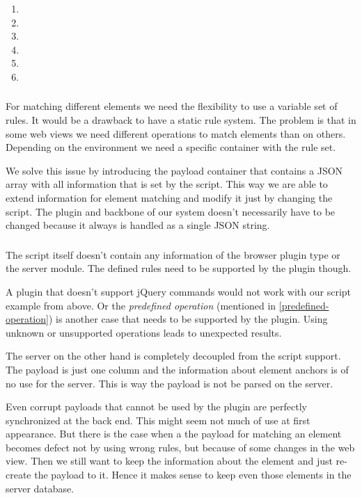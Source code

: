 \begin{enumerate}
\item \reqSi
\item \reqSii
\item \reqSiii
\item \reqSiv
\item \reqSv
\item \reqSvi
\end{enumerate}

\subsubsection[Information Container]{\reqSi}

For matching different elements we need the flexibility to use a variable set of rules. It would be a drawback to have a static rule system. The problem is that in some web views we need different operations to match elements than on others. Depending on the environment we need a specific container with the rule set. 

We solve this issue by introducing the payload container that contains a JSON array with all information that is set by the script. This way we are able to extend information for element matching and modify it just by changing the script. The plugin and backbone of our system doesn't necessarily have to be changed because it always is handled as a single JSON string.

\subsubsection[Decoupling]{\reqSii}\label{decoupled-req}

The script itself doesn't contain any information of the browser plugin type or the server module. The defined rules need to be supported by the plugin though. 

A plugin that doesn't support jQuery commands would not work with our script example from above. Or the \emph{predefined operation} (mentioned in \ref{predefined-operation}) is another case that needs to be supported by the plugin. Using unknown or unsupported operations leads to unexpected results.  

The server on the other hand is completely decoupled from the script support. The payload is just one column and the information about element anchors is of no use for the server. This is way the payload is not be parsed on the server. 

Even corrupt payloads that cannot be used by the plugin are perfectly synchronized at the back end. This might seem not much of use at first appearance. But there is the case when a the payload for matching an element becomes defect not by using wrong rules, but because of some changes in the web view. Then we still want to keep the information about the element and just re-create the payload to it. Hence it makes sense to keep even those elements in the server database.

